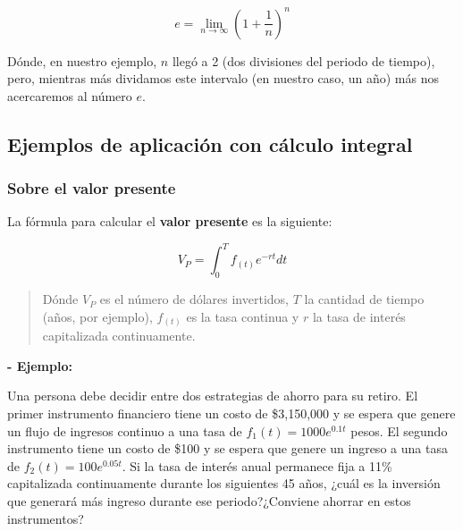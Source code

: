 \documentclass{article}
\begin{document}
            \begin{equation}
                e=\lim _{n \rightarrow \infty}\left(1+\frac{1}{n}\right)^{n}
            \end{equation}

            Dónde, en nuestro ejemplo, $n$ llegó a 2 (dos divisiones del periodo de tiempo), pero, mientras más dividamos este intervalo (en nuestro caso, un año) más nos acercaremos al número $e$.

            \subsection{Ejemplos de aplicación con cálculo integral}

                \subsubsection{Sobre el valor presente}

                    La fórmula para calcular el \textbf{valor presente} es la siguiente:

                    \begin{equation}
                        V_P=\int_{0}^{T} f_{(t)} e^{-r t} d t
                    \end{equation}

                    \begin{quote}
                        Dónde $V_P$ es el número de dólares invertidos, $T$ la cantidad de tiempo (años, por ejemplo), $f_{(t)}$ es la tasa continua y $r$ la tasa de interés capitalizada continuamente.
                    \end{quote}

                    \textbf{- Ejemplo:}

                    Una persona debe decidir entre dos estrategias de ahorro para su retiro. El primer instrumento financiero tiene un costo de \$3,150,000 y se espera que genere un flujo de ingresos continuo a una tasa de $f_{1}(t)=1000e^{0.1t}$ pesos. El segundo instrumento tiene un costo de \$100 y se espera que genere un ingreso a una tasa de $f_{2}(t)=100e^{0.05t}$. Si la tasa de interés anual permanece fija a 11\% capitalizada continuamente durante los siguientes 45 años, ¿cuál es la inversión que generará más ingreso durante ese periodo?¿Conviene ahorrar en estos instrumentos?
                        
\end{document}

